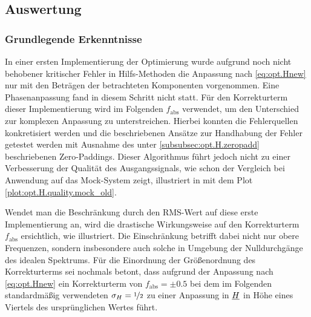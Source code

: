 \documentclass[../Report.tex]{subfiles}
\begin{document}
 

\subsection{Auswertung}
\label{subsec:opt.H.auswertung}

\subsubsection{Grundlegende Erkenntnisse}

In einer ersten Implementierung der Optimierung wurde aufgrund noch nicht behobener kritischer Fehler in Hilfs-Methoden die Anpassung nach \eqref{eq:opt.Hnew} nur mit den Beträgen der betrachteten Komponenten vorgenommen. Eine Phasenanpassung fand in diesem Schritt nicht statt. Für den Korrekturterm dieser Implementierung wird im Folgenden $f_{\mathrm{abs}}$ verwendet, um den Unterschied zur komplexen Anpassung zu unterstreichen.
Hierbei konnten die Fehlerquellen konkretisiert werden und die beschriebenen Ansätze zur Handhabung der Fehler getestet werden mit Ausnahme des unter \ref{subsubsec:opt.H.zeropadd} beschriebenen Zero-Paddings.
Dieser Algorithmus führt jedoch nicht zu einer Verbesserung der Qualität des Ausgangssignals, wie schon der Vergleich bei Anwendung auf das Mock-System zeigt, illustriert in  mit dem Plot \ref{plot:opt.H.quality.mock_old}. 

Wendet man die Beschränkung durch den RMS-Wert auf diese erste Implementierung an, wird die drastische Wirkungsweise auf den Korrekturterm $f_{\mathrm{abs}}$ ersichtlich, wie  illustriert. Die Einschränkung betrifft dabei nicht nur obere Frequenzen, sondern insbesondere auch solche in Umgebung der Nulldurchgänge des idealen Spektrums.
Für die Einordnung der Größenordnung des Korrekturterms sei nochmals betont, dass aufgrund der Anpassung nach \eqref{eq:opt.Hnew} ein Korrekturterm von $f_{\mathrm{abs}} = \pm 0.5$ bei dem im Folgenden standardmäßig verwendeten $\sigma_H = \nicefrac{1}{2}$ zu einer Anpassung in $\underline{H}$ in Höhe eines Viertels des ursprünglichen Wertes führt.

 \fabsOrig 
{} \fabsRMSone 
\end{document}
